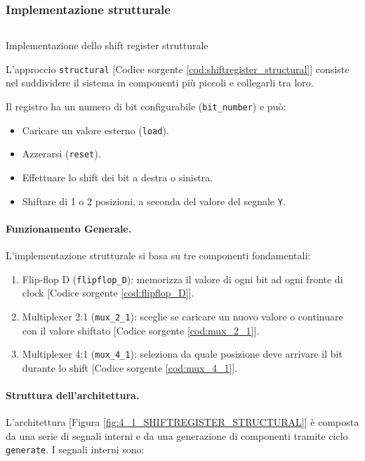 \subsubsection{Implementazione strutturale}
\begin{code}
    \inputminted{vhdl}{vhdl/shiftregister_structural.vhd}
    \caption{Implementazione dello shift register strutturale}
    \label{cod:shiftregister_structural}
\end{code}

L'approccio \texttt{structural} [Codice sorgente \ref{cod:shiftregister_structural}] consiste nel suddividere il sistema in componenti più piccoli e collegarli tra loro.

Il registro ha un numero di bit configurabile (\texttt{bit\_number}) e può:
\begin{itemize}
    \item Caricare un valore esterno (\texttt{load}).
    \item Azzerarsi (\texttt{reset}).
    \item Effettuare lo shift dei bit a destra o sinistra.
    \item Shiftare di 1 o 2 posizioni, a seconda del valore del segnale \texttt{Y}.
\end{itemize}

\paragraph{Funzionamento Generale.}
L'implementazione strutturale si basa su tre componenti fondamentali:
\begin{enumerate}
    \item Flip-flop D (\texttt{flipflop\_D}): memorizza il valore di ogni bit ad ogni fronte di clock [Codice sorgente \ref{cod:flipflop_D}].
    \item Multiplexer 2:1 (\texttt{mux\_2\_1}): sceglie se caricare un nuovo valore o continuare con il valore shiftato [Codice sorgente \ref{cod:mux_2_1}].
    \item Multiplexer 4:1 (\texttt{mux\_4\_1}): seleziona da quale posizione deve arrivare il bit durante lo shift [Codice sorgente \ref{cod:mux_4_1}].
\end{enumerate}

\paragraph{Struttura dell'architettura.}
L'architettura [Figura \ref{fig:4_1_SHIFTREGISTER_STRUCTURAL}] è composta da una serie di segnali interni e da una generazione di componenti tramite ciclo \texttt{generate}. I segnali interni sono:

